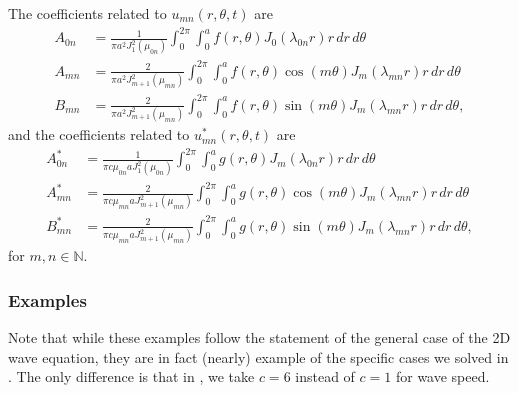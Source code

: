 \begin{enumerate}
	The coefficients related to $u_{mn}(r,\theta,t)$ are
	\begin{align}
		A_{0n} &= \frac{1}{\pi a^2J_1^2(\mu_{0n})} \int_0^{2\pi} \int_0^a f(r,\theta) J_0(\lambda_{0n}r) r \,dr\,d\theta \\
		\label{eq:wave2dgen1}
		A_{mn} &= \frac{2}{\pi a^2J_{m+1}^2(\mu_{mn})} \int_0^{2\pi} \int_0^a f(r,\theta) \cos(m\theta) J_m(\lambda_{mn}r) r \,dr\,d\theta \\
		B_{mn} &= \frac{2}{\pi a^2J_{m+1}^2(\mu_{mn})} \int_0^{2\pi} \int_0^a f(r,\theta) \sin(m\theta) J_m(\lambda_{mn}r) r \,dr\,d\theta,
	\end{align}
	and the coefficients related to $u_{mn}^*(r,\theta,t)$ are
	\begin{align}
		A_{0n}^* &= \frac{1}{\pi c\mu_{0n} aJ_1^2(\mu_{0n})} \int_0^{2\pi} \int_0^a g(r,\theta) J_m(\lambda_{0n}r) r \,dr\,d\theta \\
		A_{mn}^* &= \frac{2}{\pi c\mu_{mn} aJ_{m+1}^2(\mu_{mn})} \int_0^{2\pi} \int_0^a g(r,\theta) \cos(m\theta) J_m(\lambda_{mn}r) r \,dr\,d\theta \\
		B_{mn}^* &= \frac{2}{\pi c\mu_{mn} aJ_{m+1}^2(\mu_{mn})} \int_0^{2\pi} \int_0^a g(r,\theta) \sin(m\theta) J_m(\lambda_{mn}r) r \,dr\,d\theta,
	\end{align}
	for $m,n \in \mathbb{N}$.
\end{enumerate}

\subsubsection{Examples}

Note that while these examples follow the statement of the general case of the 2D wave equation, they are in fact (nearly) example of the specific cases we solved in . The only difference is that in , we take $c=6$ instead of $c=1$ for wave speed.

